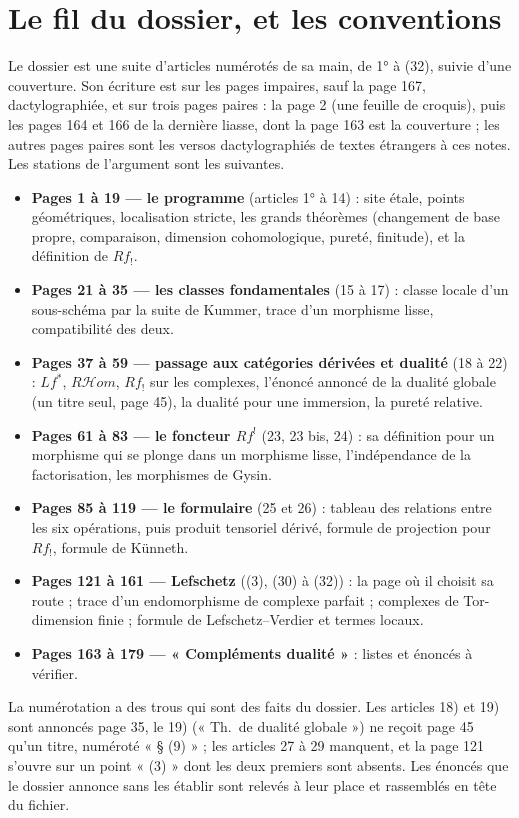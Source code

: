 \documentclass[11pt,a4paper]{article}
\begin{document}
\section*{Le fil du dossier, et les conventions}

Le dossier est une suite d'articles numérotés de sa main, de 1° à (32), suivie
d'une couverture. Son écriture est sur les pages impaires, sauf la page 167, dactylographiée,
et sur trois pages paires : la page 2 (une feuille de croquis), puis les pages
164 et 166 de la dernière liasse, dont la page 163 est la couverture ; les
autres pages paires sont les versos dactylographiés de textes étrangers à ces
notes. Les stations
de l'argument sont les suivantes.

\begin{itemize}
\item \textbf{Pages 1 à 19 --- le programme} (articles 1° à 14) : site étale,
points géométriques, localisation stricte, les grands théorèmes (changement de
base propre, comparaison, dimension cohomologique, pureté, finitude), et la
définition de $Rf_{!}$.
\item \textbf{Pages 21 à 35 --- les classes fondamentales} (15 à 17) : classe
locale d'un sous-schéma par la suite de Kummer, trace d'un morphisme lisse,
compatibilité des deux.
\item \textbf{Pages 37 à 59 --- passage aux catégories dérivées et dualité}
(18 à 22) : $Lf^{*}$, $R\mathcal{H}om$, $Rf_{!}$ sur les complexes, l'énoncé
annoncé de la dualité globale (un titre seul, page 45), la dualité pour une
immersion, la pureté relative.
\item \textbf{Pages 61 à 83 --- le foncteur $Rf^{!}$} (23, 23 bis, 24) : sa
définition pour un morphisme qui se plonge dans un morphisme lisse,
l'indépendance de la factorisation, les morphismes de Gysin.
\item \textbf{Pages 85 à 119 --- le formulaire} (25 et 26) : tableau des
relations entre les six opérations, puis produit tensoriel dérivé, formule de
projection pour $Rf_{!}$, formule de Künneth.
\item \textbf{Pages 121 à 161 --- Lefschetz} ((3), (30) à (32)) : la page où il
choisit sa route ; trace d'un endomorphisme de complexe parfait ; complexes de
Tor-dimension finie ; formule de Lefschetz--Verdier et termes locaux.
\item \textbf{Pages 163 à 179 --- « Compléments dualité »} : listes et énoncés
à vérifier.
\end{itemize}

La numérotation a des trous qui sont des faits du dossier. Les articles 18) et
19) sont annoncés page 35, le 19) (« Th.\ de dualité globale ») ne reçoit
page 45 qu'un titre, numéroté « § (9) » ; les articles 27 à 29 manquent, et la
page 121 s'ouvre sur un point « (3) » dont les deux premiers sont absents. Les
énoncés que le dossier annonce sans les établir sont relevés à leur place et
rassemblés en tête du fichier.
\end{document}
